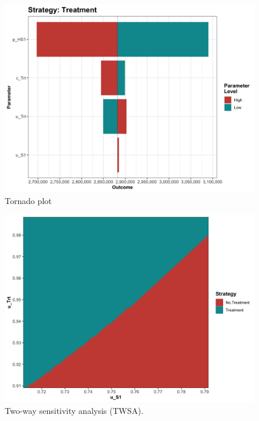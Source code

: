 \documentclass[]{book}
\begin{document}
\begin{figure}

{\centering \includegraphics[width=1\linewidth]{../figs/05b_tornado_lrm_Treatment_nmb} 

}

\caption{Tornado plot}\label{fig:05b-tornado-lrm-Treatment-nmb}
\end{figure}

\begin{figure}

{\centering \includegraphics[width=1\linewidth]{../figs/05b_twsa_lrm_uS1_uTrt_nmb} 

}

\caption{Two-way sensitivity analysis (TWSA).}\label{fig:05b-twsa-lrm-uS1-uTrt-nmb}
\end{figure}
\end{document}
